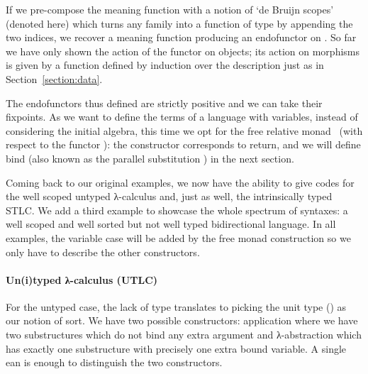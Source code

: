 If we pre-compose the meaning function  with a notion of `de Bruijn scopes'
(denoted  here) which turns any   family into a function
of type      by appending the two
 indices, we recover a meaning function producing an endofunctor on
 . So far we have only shown the action of the functor on objects;
its action on morphisms is given by a function  defined by induction over
the description just as in Section~\ref{section:data}.

\begin{center}
\end{center}

The endofunctors thus defined are strictly positive and we can take their fixpoints.
As we want to define the terms of a language with variables, instead of
considering the initial algebra, this time we opt for the free relative
monad~\cite{JFR4389} (with respect to the functor ): the 
constructor corresponds to return, and we will define bind (also known as
the parallel substitution ) in the next section.


\begin{center}
\end{center}

Coming back to our original examples, we now have the ability to give
codes for the well scoped untyped λ-calculus and, just as well,
the intrinsically typed STLC. We add a third
example to showcase the whole spectrum of syntaxes: a well scoped and
well sorted but not well typed bidirectional language. In all examples,
the variable case will be added by the free monad construction so we only
have to describe the other constructors.


\paragraph*{Un(i)typed λ-calculus (UTLC)} For the untyped case, the lack of
type translates to picking the unit type () as our notion of sort.
We have two possible
constructors: application where we have two substructures which do not bind
any extra argument and λ-abstraction which has exactly one substructure
with precisely one extra bound variable. A single ean is enough to
distinguish the two constructors.


